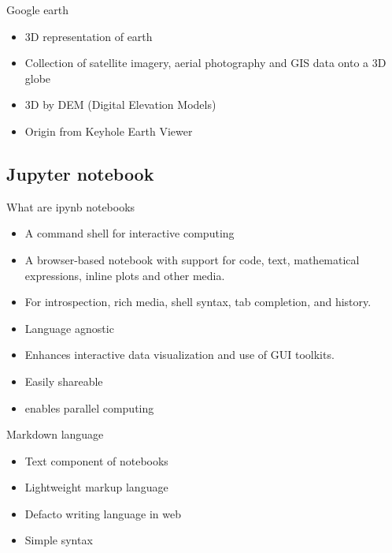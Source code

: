 	
\begin{frame}{Google earth}
	\begin{beamerboxesrounded}{}
		\begin{itemize}
			\item 3D representation of earth 
			\item Collection of  satellite imagery, aerial photography and GIS data onto a 3D globe
			\item 3D by DEM (Digital Elevation Models)
			\item Origin from Keyhole Earth Viewer
		\end{itemize}
	\end{beamerboxesrounded}
\end{frame}




\subsection[Jupyter notebook]{Jupyter notebook}
\begin{frame}{What are ipynb notebooks}
	\begin{beamerboxesrounded}{}
		\begin{itemize}
			\item A command shell for interactive computing
			\item A browser-based notebook with support for code, text, mathematical expressions, inline plots and other media.
			\item For  introspection, rich media, shell syntax, tab completion, and history.
			\item Language agnostic 
			\item Enhances interactive data visualization and use of GUI toolkits.
			\item Easily shareable 
			\item enables parallel computing 
		\end{itemize}
	\end{beamerboxesrounded}
\end{frame}

\begin{frame}{Markdown language}
	\begin{beamerboxesrounded}{}
		\begin{itemize}
			\item Text component of notebooks
			\item Lightweight markup language
			\item Defacto writing language in web
			\item Simple syntax
		\end{itemize}
	\end{beamerboxesrounded}
\end{frame}


